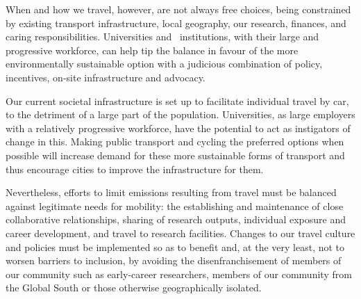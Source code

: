 \documentclass[../SustainableHEP.tex]{subfiles}
\begin{document}
When and how we travel, however, are not always free choices, being constrained by existing transport infrastructure, local geography, our research, finances, and caring responsibilities.  
Universities and \ACR\ institutions, with their large and progressive workforce, can help tip the balance in favour of the more environmentally sustainable option with a judicious combination of policy, incentives, on-site infrastructure and advocacy.

Our current societal infrastructure is set up to facilitate individual travel by car, to the detriment of a large part of the population. Universities, as large employers with a relatively progressive workforce, have the potential to act as instigators of change in this. Making public transport and cycling the preferred options when possible will increase demand for these more sustainable forms of transport and thus encourage cities to improve the infrastructure for them.

Nevertheless, efforts to limit emissions resulting from travel must be balanced against legitimate needs for mobility: the establishing and maintenance of close collaborative relationships, sharing of research outputs, individual exposure and career development, and travel to research facilities. 
Changes to our travel culture and policies must be implemented so as to benefit and, at the very least, not to worsen barriers to inclusion, by avoiding the disenfranchisement of members of our community such as early-career researchers, members of our community from the Global South or those otherwise geographically isolated. 
\end{document}
